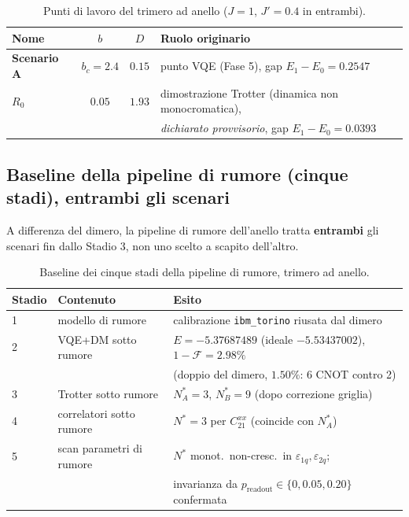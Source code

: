 \documentclass[11pt,a4paper]{article}
\begin{document}
\begin{table}[htbp]
\centering
\caption{Punti di lavoro del trimero ad anello ($J=1$, $J'=0.4$ in entrambi).}
\label{tab:anello-punti}
\begin{tabular}{lccl}
\toprule
Nome & $b$ & $D$ & Ruolo originario \\
\midrule
\textbf{Scenario A} & $b_c=2.4$ & $0.15$ & punto VQE (Fase 5), gap $E_1-E_0=0.2547$ \\
\textbf{$R_0$} & $0.05$ & $1.93$ & dimostrazione Trotter (dinamica non
monocromatica),\\
& & & \emph{dichiarato provvisorio}, gap $E_1-E_0=0.0393$ \\
\bottomrule
\end{tabular}
\end{table}


\subsection{Baseline della pipeline di rumore (cinque stadi), entrambi gli scenari}

A differenza del dimero, la pipeline di rumore dell'anello tratta
\textbf{entrambi} gli scenari fin dallo Stadio 3, non uno scelto a scapito
dell'altro.

\begin{table}[htbp]
\centering
\caption{Baseline dei cinque stadi della pipeline di rumore, trimero ad anello.}
\label{tab:anello-stadi}
\begin{tabular}{lll}
\toprule
Stadio & Contenuto & Esito \\
\midrule
1 & modello di rumore & calibrazione \texttt{ibm\_torino} riusata dal dimero \\
2 & VQE+DM sotto rumore & $E=-5.37687489$ (ideale $-5.53437002$), $1-\mathcal F=2.98\%$\\
  & & (doppio del dimero, $1.50\%$: 6 CNOT contro 2) \\
3 & Trotter sotto rumore & $N^*_A=3$, $N^*_B=9$ (dopo correzione griglia) \\
4 & correlatori sotto rumore & $N^*=3$ per $C_{21}^{xx}$ (coincide con $N^*_A$) \\
5 & scan parametri di rumore & $N^*$ monot.\ non-cresc.\ in $\varepsilon_{1q},\varepsilon_{2q}$;\\
  & & invarianza da $p_\text{readout}\in\{0,0.05,0.20\}$ confermata \\
\bottomrule
\end{tabular}
\end{table}
\end{document}
